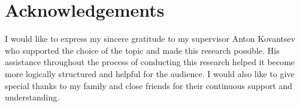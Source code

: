 \documentclass[13pt, a4paper]{article}
\begin{document}
\newpage

\section*{Acknowledgements}

I would like to express my sincere gratitude to my supervisor Anton Kovantsev who supported the choice of the topic and made this research possible. His assistance throughout the process of conducting this research helped it become more logically structured and helpful for the audience. I would also like to give special thanks to my family and close friends for their continuous support and understanding.

{}

\end{document}
